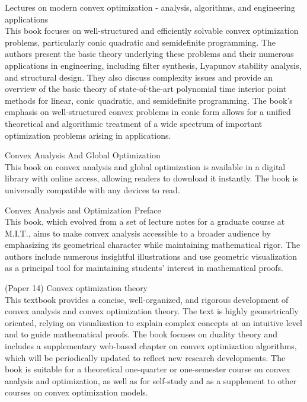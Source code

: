 \documentclass{article}
\begin{document}
\cite{Ben-Tal2001LecturesOM} Lectures on modern convex optimization - analysis, algorithms, and engineering applications \\
This book focuses on well-structured and efficiently solvable convex optimization problems, particularly conic quadratic and semidefinite programming. The authors present the basic theory underlying these problems and their numerous applications in engineering, including filter synthesis, Lyapunov stability analysis, and structural design. They also discuss complexity issues and provide an overview of the basic theory of state-of-the-art polynomial time interior point methods for linear, conic quadratic, and semidefinite programming. The book's emphasis on well-structured convex problems in conic form allows for a unified theoretical and algorithmic treatment of a wide spectrum of important optimization problems arising in applications.

\cite{Strauss2016ConvexAA} Convex Analysis And Global Optimization \\
This book on convex analysis and global optimization is available in a digital library with online access, allowing readers to download it instantly. The book is universally compatible with any devices to read.

\cite{None} Convex Analysis and Optimization Preface \\
This book, which evolved from a set of lecture notes for a graduate course at M.I.T., aims to make convex analysis accessible to a broader audience by emphasizing its geometrical character while maintaining mathematical rigor. The authors include numerous insightful illustrations and use geometric visualization as a principal tool for maintaining students' interest in mathematical proofs.

(Paper 14) Convex optimization theory \\
This textbook provides a concise, well-organized, and rigorous development of convex analysis and convex optimization theory. The text is highly geometrically oriented, relying on visualization to explain complex concepts at an intuitive level and to guide mathematical proofs. The book focuses on duality theory and includes a supplementary web-based chapter on convex optimization algorithms, which will be periodically updated to reflect new research developments. The book is suitable for a theoretical one-quarter or one-semester course on convex analysis and optimization, as well as for self-study and as a supplement to other courses on convex optimization models.
\end{document}
